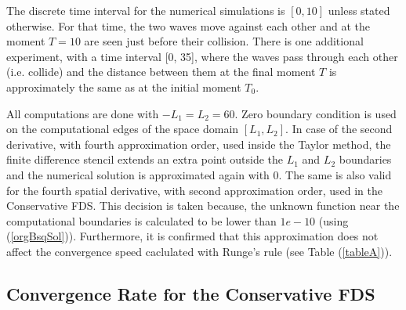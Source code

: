 \documentclass[%
 aip,
cp,  
 amsmath,amssymb,
 reprint,
]{iopconfser}
\newcommand{\rf}[1]{(\ref{#1})}
\begin{document}
The discrete time interval for the numerical simulations is $[0, 10]$ unless stated otherwise. For that time, the two waves move against each other and at the moment $T=10$ are seen just before their collision. There is one additional experiment, with a time interval [0, 35], where the waves pass through each other (i.e. collide) and the distance between them at the final moment $T$ is approximately the same as at the initial moment $T_0$. 

All computations are done with $-L_1 = L_2 = 60$.
Zero boundary condition is used on the computational edges of the space domain $[L_1, L_2]$. In case of the second derivative, with fourth approximation order, used inside the Taylor method, the finite difference stencil extends an extra point outside the $L_1$ and $L_2$ boundaries and the numerical solution is approximated again with $0$. The same is also valid for the fourth spatial derivative, with second approximation order, used in the Conservative FDS. This decision is taken because, the unknown function near the computational boundaries is calculated to be lower than $1e-10$ (using \rf{orgBsqSol}). Furthermore, it is confirmed that
this approximation does not affect the convergence speed caclulated with Runge's rule (see Table \rf{tableA}).

\subsection{Convergence Rate for the Conservative FDS}
\end{document}
